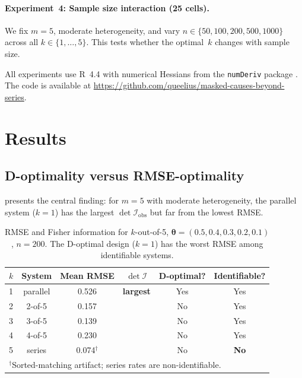 \documentclass[12pt]{article}
\theoremstyle{definition}
\theoremstyle{remark}
\newcommand{\bthet}{\boldsymbol{\theta}}
\begin{document}
\paragraph{Experiment~4: Sample size interaction (25 cells).}
We fix $m = 5$, moderate heterogeneity, and vary $n \in \{50, 100,
200, 500, 1000\}$ across all $k \in \{1, \ldots, 5\}$.  This tests
whether the optimal~$k$ changes with sample size.

All experiments use R~4.4 \citep{RCore2024} with numerical Hessians
from the \texttt{numDeriv} package \citep{numDeriv}.  The code is
available at
\url{https://github.com/queelius/masked-causes-beyond-series}.


\section{Results}
\label{sec:results}

\subsection{D-optimality versus RMSE-optimality}
\label{sec:res_dopt}

 presents the central finding: for $m = 5$
with moderate heterogeneity, the parallel system ($k = 1$) has the
largest $\det \mathcal{I}_{\mathrm{obs}}$ but far from the lowest
RMSE.

\begin{table}[htbp]
  \centering
  \caption{RMSE and Fisher information for $k$-out-of-5,
    $\bthet = (0.5, 0.4, 0.3, 0.2, 0.1)$, $n = 200$.
    The D-optimal design ($k = 1$) has the worst RMSE among
    identifiable systems.}
  \label{tab:optimal_k_m5}
  \begin{tabular}{lccccc}
    \toprule
    $k$ & System & Mean RMSE & $\det \mathcal{I}$ & D-optimal? & Identifiable? \\
    \midrule
    1 & parallel & 0.526 & \textbf{largest} & Yes & Yes \\
    2 & 2-of-5   & 0.157 &                  & No  & Yes \\
    3 & 3-of-5   & 0.139 &                  & No  & Yes \\
    4 & 4-of-5   & 0.230 &                  & No  & Yes \\
    5 & series   & 0.074$^\dagger$ &         & No  & \textbf{No} \\
    \bottomrule
    \multicolumn{6}{l}{\footnotesize $^\dagger$Sorted-matching artifact;
      series rates are non-identifiable.}
  \end{tabular}
\end{table}
\end{document}
